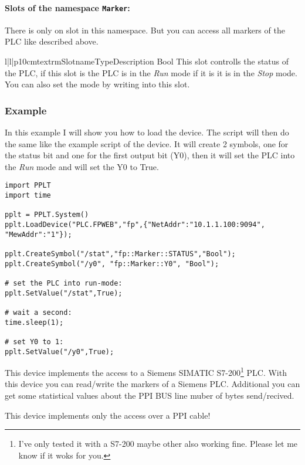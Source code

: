 \paragraph{Slots of the namespace \texttt{Marker}:}
There is only on slot in this namespace. But you can access all markers 
of the PLC like described above.
\begin{tableiii}{l|l|p{10cm}}{textrm}{Slotname}{Type}{Description}
        {Bool}
        {This slot controlls the status of the PLC, if this slot is 
         the PLC is in the \emph{Run} mode if it is
         it is in the \emph{Stop} mode. You can also
        set the mode by writing into this slot.}
\end{tableiii}

\subsubsection{Example}
In this example I will show you how to load the  device. 
The script will then do the same like the example script of the 
 device. It will create 2 symbols, one for
the status bit and one for the first output bit (Y0), then it will
set the PLC into the \emph{Run} mode and will set the Y0 to True.

\begin{verbatim}
import PPLT
import time

pplt = PPLT.System()
pplt.LoadDevice("PLC.FPWEB","fp",{"NetAddr":"10.1.1.100:9094", "MewAddr":"1"});

pplt.CreateSymbol("/stat","fp::Marker::STATUS","Bool");
pplt.CreateSymbol("/y0", "fp::Marker::Y0", "Bool");

# set the PLC into run-mode:
pplt.SetValue("/stat",True);

# wait a second:
time.sleep(1);

# set Y0 to 1:
pplt.SetValue("/y0",True);
\end{verbatim}






This device implements the access to a Siemens SIMATIC 
S7-200\footnote{I've only tested it with a S7-200 maybe other also working 
fine. Please let me know if it woks for you.} PLC. With this device you can 
read/write the markers of a Siemens PLC. Additional you can get some 
statistical values about the PPI BUS line muber of bytes send/recived.
\begin{notice}
This device implements only the access over a PPI cable!
\end{notice}


